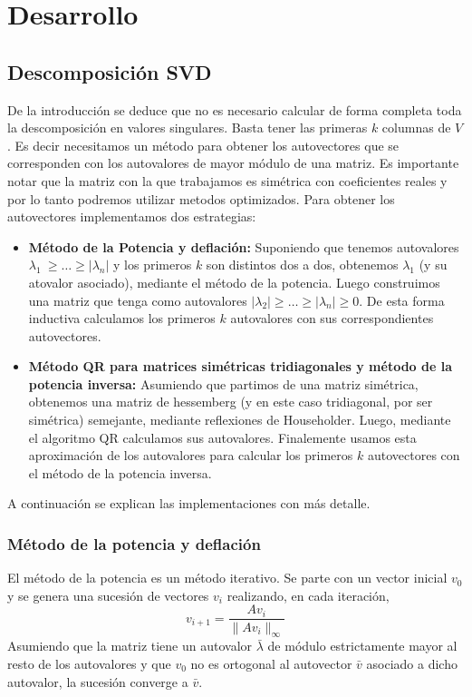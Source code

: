 \section{Desarrollo}

\subsection{Descomposici\'on SVD}

	\PARstart De la introducci\'on se deduce que no es necesario calcular de forma
	completa toda la descomposici\'on en valores singulares. Basta tener
	las primeras $k$ columnas de $V$. Es decir necesitamos un m\'etodo para
	obtener los autovectores que se corresponden con los autovalores de mayor
	m\'odulo de una matriz.
	Es importante notar que la matriz con la que trabajamos es sim\'etrica
	con coeficientes reales y por lo tanto podremos utilizar metodos optimizados.
	Para obtener los autovectores implementamos dos estrategias:

	\begin{itemize}
		\item \textbf{M\'etodo de la Potencia y deflaci\'on:} Suponiendo que
		tenemos autovalores $\lambda_1\ \geq \ldots \geq |\lambda_n|$ y los primeros
		$k$ son distintos dos a dos, obtenemos $\lambda_1$ (y su atovalor asociado),
		mediante el m\'etodo de la potencia. Luego
		construimos una matriz que tenga como autovalores
		$|\lambda_2| \geq \ldots \geq |\lambda_n| \geq 0$.
		De esta forma inductiva calculamos los primeros $k$ autovalores
		con sus correspondientes autovectores.

		\item \textbf{M\'etodo QR para matrices sim\'etricas tridiagonales y
		m\'etodo de la potencia inversa:} Asumiendo que partimos de una matriz
		sim\'etrica, obtenemos una matriz de hessemberg (y en este caso
		tridiagonal, por ser sim\'etrica) semejante, mediante reflexiones de
		Householder. Luego, mediante el algoritmo QR calculamos sus
		autovalores. Finalemente usamos esta aproximaci\'on de
		los autovalores para calcular los primeros $k$ autovectores con el m\'etodo
		de la potencia inversa.
	\end{itemize}

	A continuaci\'on se explican las implementaciones con m\'as detalle.

	\subsubsection{M\'etodo de la potencia y deflaci\'on}
		El m\'etodo de la potencia es un m\'etodo iterativo. Se parte con un vector
		inicial $v_0$ y se genera una sucesi\'on de vectores ${v_i}$ realizando,
		en cada iteraci\'on, $$v_{i+1} = \frac{Av_i}{\|Av_i\|_{\infty}}$$
		Asumiendo que la matriz tiene un autovalor $\bar{\lambda}$ de m\'odulo
		estrictamente
		mayor al resto de los autovalores y que $v_0$ no es ortogonal al
		autovector $\bar{v}$ asociado a dicho autovalor, la sucesi\'on converge 
		a $\bar{v}$.

